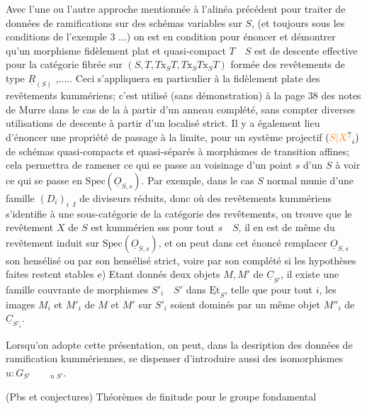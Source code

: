 Avec l'une ou l'autre approche mentionnée à l'alinéa précédent pour traiter de données de ramifications sur des schémas variables sur $S$, (et toujours sous les conditions de l'exemple 3 ...) on est en condition pour énoncer et démontrer qu'un morphisme fidèlement plat et quasi-compact $T\quad S$ est de descente effective pour la catégorie fibrée sur $(S,T,T\mathbin{\mathrm{x}}_S T,T\mathbin{\mathrm{x}}_S T\mathbin{\mathrm{x}}_S T)$ formée des revêtements de type $\underline R_{(S)}$ ,..... Ceci s'appliquera en particulier à la  fidèlement plate des revêtements kummériens; c'est utilisé (sans démonstration) à la page 38 des notes de Murre dans le cas de la  à partir d'un anneau complété, sans compter diverses utilisations de descente à partir d'un localisé strict. Il y a également lieu d'énoncer une propriété de passage à la limite, pour un système projectif $(\unsure{S|X}_i)$ de schémas quasi-compacts et quasi-séparés à morphismes de transition affines; cela permettra de ramener ce qui se passe au voisinage d'un point $s$ d'un $S$ à voir ce qui se passe en $\mathrm{Spec}(\underline O_{S,s})$. Par exemple, dans le cas $S$  normal munie d'une famille $(D_i)_{i\;\;I}$ de diviseurs réduits, donc où  des revêtements kummériens s'identifie à  une sous-catégorie de la catégorie des revêtements, on trouve que le revêtement $X$ de $S$ est  kummérien sss pour tout $s\quad S$, il en est de même du revêtement induit sur $\mathrm{Spec}(\underline O_{S,s})$, et on peut dans cet énoncé remplacer $\underline O_{S,s}$ son hensélisé ou par son hensélisé strict,  voire par son complété si les hypothèses faites restent stables
e) Etant donnés deux objets $M,M'$ de $\underline C_{S'}$, il existe une famille couvrante de morphismes $S'_i\quad S'$ dans $\underline{\mathrm{Et}}_S$, telle que pour tout $i$, les images $M_i$ et $M'_i$ de $M$ et $M'$ sur $S'_i$ soient dominés par un même objet $M''_i$ de  $\underline C_{S'_i}$.

Lorsqu'on adopte cette présentation, on peut, dans la desription des données de ramification kummériennes, se dispenser d'introduire aussi des isomorphismes  $u:G_{S'}\qquad{}_{n\;S'}$.
\uline{}

(Pbs et conjectures)
Théorèmes de finitude pour le groupe fondamental

